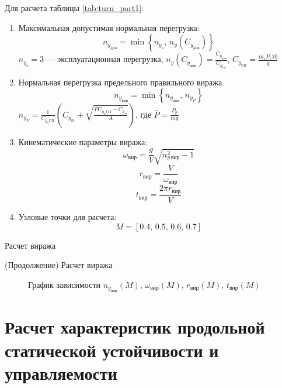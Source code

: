 Для расчета таблицы \ref{tab:turn_part1}: 
\begin{enumerate}
    \item Максимальная допустимая нормальная перегрузка:
        \[
            n_{y_{доп}}=\min \left\{ n_{y_{э}},\,n_y(C_{y_{доп}}) \right\} 
        \]
        $n_{y_{э}} = 3$ --- эксплуатационная перегрузка, $n_y(C_{y_{доп}}) = \frac{C_{y_{доп}}}{C_{y_{ГП}}}$,
        $C_{y_{ГП}} = \frac{\bar{m}_с P_s 10}{q}$
    \item Нормальная перегрузка предельного правильного виража
        \[
            n_{y_{вир}}=\min \left\{ n_{y_{доп}},\,n_{y_P} \right\} 
        \]
        $n_{y_{P}} = \frac{1}{C_{y_{a}ГП}} \left( C_{y_m} + \sqrt{
        \frac{\bar{P} C_{y_{a}ГП} - C_{x_{м}} }{A}} \right) $, где $\bar{P} = \frac{P_p}{mg}$
    \item Кинематические параметры виража:
        \[
            \omega_{вир}  = \frac{g}{V} \sqrt{n_{y\, вир}^2 - 1}
        \]
        \[
            r_{вир} = \frac{V}{\omega_{вир}}
        \]
        \[
            t_{вир} = \frac{2 \pi r_{вир}}{V}
        \]
        \item Узловые точки для расчета:
        \[
            M = [0.4,\, 0.5,\, 0.6,\,0.7]
        \]

\end{enumerate}

\begin{table}[H]
    \centering
    \caption{Расчет виража}
    \label{tab:turn_part1}
    
\end{table}

\addtocounter{table}{-1}
\addtocounter{totaltables}{-1}
\begin{table}[H]
    \centering
    \caption{(Продолжение) Расчет виража}
    \label{tab:turn_part2}
    
\end{table}
 
\begin{figure}[H]
\centering
\resizebox{.79\linewidth}{!}{}
\caption{График зависимости $n_{y_{вир}}(M)$, $\omega_{вир}(M)$, $r_{вир}(M)$, $t_{вир}(M)$}
\label{fig:turn}
\end{figure}

\section{Расчет характеристик продольной статической устойчивости и
управляемости}

